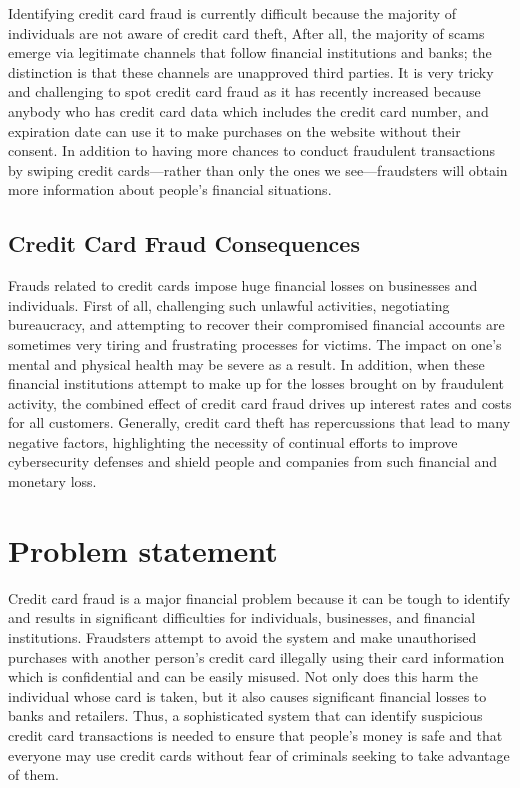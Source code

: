 Identifying credit card fraud is currently difficult because the majority of individuals are not aware of credit card theft, After all, the majority of scams emerge via legitimate channels that follow financial institutions and banks; the distinction is that these channels are unapproved third parties. It is very tricky and challenging to spot credit card fraud as it has recently increased because anybody who has credit card data which includes the credit card number, and expiration date can use it to make purchases on the website without their consent. In addition to having more chances to conduct fraudulent transactions by swiping credit cards—rather than only the ones we see—fraudsters will obtain more information about people's financial situations. 
\subsection{Credit Card Fraud Consequences}

Frauds related to credit cards impose huge financial losses on businesses and individuals. First of all, challenging such unlawful activities, negotiating bureaucracy, and attempting to recover their compromised financial accounts are sometimes very tiring and frustrating processes for victims. The impact on one's mental and physical health may be severe as a result. In addition, when these financial institutions attempt to make up for the losses brought on by fraudulent activity, the combined effect of credit card fraud drives up interest rates and costs for all customers. Generally, credit card theft has repercussions that lead to many negative factors, highlighting the necessity of continual efforts to improve cybersecurity defenses and shield people and companies from such financial and monetary loss. 
\section{Problem statement}
\label{sec:intro_prob_art}
Credit card fraud is a major financial problem because it can be tough to identify and results in significant difficulties for individuals, businesses, and financial institutions. Fraudsters attempt to avoid the system and make unauthorised purchases with another person's credit card illegally using their card information which is confidential and can be easily misused. Not only does this harm the individual whose card is taken, but it also causes significant financial losses to banks and retailers. Thus, a sophisticated system that can identify suspicious credit card transactions is needed to ensure that people's money is safe and that everyone may use credit cards without fear of criminals seeking to take advantage of them.

